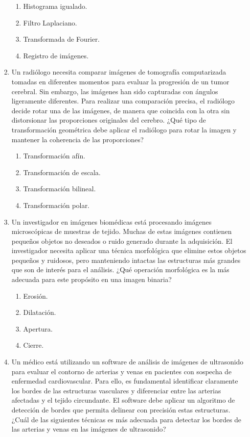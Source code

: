 \documentclass[12pt,a4paper]{article}
\providecommand{\tightlist}{%
  \setlength{\itemsep}{0pt}\setlength{\parskip}{0pt}}\usepackage{longtable,booktabs,array}
\providecommand{\tightlist}{%
  \setlength{\itemsep}{0pt}\setlength{\parskip}{2pt}}
\begin{document}
\begin{enumerate}
  \begin{enumerate}
  \tightlist
  \item
    Histograma igualado.
  \item
    Filtro Laplaciano.
  \item
    Transformada de Fourier.
  \item
    Registro de imágenes.
  \end{enumerate}
\item
  Un radiólogo necesita comparar imágenes de tomografía computarizada
  tomadas en diferentes momentos para evaluar la progresión de un tumor
  cerebral. Sin embargo, las imágenes han sido capturadas con ángulos
  ligeramente diferentes. Para realizar una comparación precisa, el
  radiólogo decide rotar una de las imágenes, de manera que coincida con
  la otra sin distorsionar las proporciones originales del cerebro. ¿Qué
  tipo de transformación geométrica debe aplicar el radiólogo para rotar
  la imagen y mantener la coherencia de las proporciones?

  \begin{enumerate}
  \tightlist
  \item
    Transformación afín.
  \item
    Transformación de escala.
  \item
    Transformación bilineal.
  \item
    Transformación polar.
  \end{enumerate}
\item
  Un investigador en imágenes biomédicas está procesando imágenes
  microscópicas de muestras de tejido. Muchas de estas imágenes
  contienen pequeños objetos no deseados o ruido generado durante la
  adquisición. El investigador necesita aplicar una técnica morfológica
  que elimine estos objetos pequeños y ruidosos, pero manteniendo
  intactas las estructuras más grandes que son de interés para el
  análisis. ¿Qué operación morfológica es la más adecuada para este
  propósito en una imagen binaria?

  \begin{enumerate}
  \tightlist
  \item
    Erosión.
  \item
    Dilatación.
  \item
    Apertura.
  \item
    Cierre.
  \end{enumerate}
\item
  Un médico está utilizando un software de análisis de imágenes de
  ultrasonido para evaluar el contorno de arterias y venas en pacientes
  con sospecha de enfermedad cardiovascular. Para ello, es fundamental
  identificar claramente los bordes de las estructuras vasculares y
  diferenciar entre las arterias afectadas y el tejido circundante. El
  software debe aplicar un algoritmo de detección de bordes que permita
  delinear con precisión estas estructuras. ¿Cuál de las siguientes
  técnicas es más adecuada para detectar los bordes de las arterias y
  venas en las imágenes de ultrasonido?


\end{enumerate}
\end{document}
